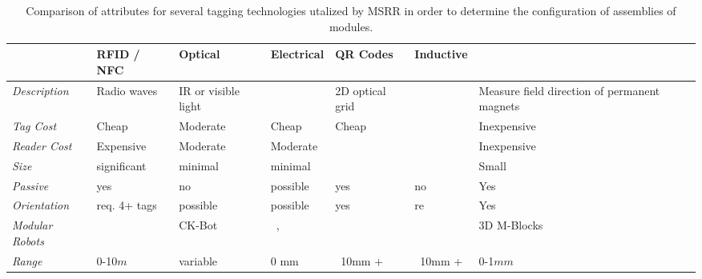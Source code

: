 \begin{table*}[t]
	\centering
	\caption{Comparison of attributes for several tagging technologies utalized by MSRR in order to determine the configuration of assemblies of modules.}
	\newcommand{\wdd}{2.05cm}
	\begin{tabular}{ p{1.7 cm} p{\wdd}  p{\wdd} p{\wdd} p{\wdd} p{\wdd} p{\wdd} p{\wdd}  }
		\hline
		\addlinespace[1ex]
											& RFID / NFC		& Optical				& Electrical 		& QR Codes 			& Inductive			& \bf{\tagNamePlural} \\ %
		\hline

		\textit{Description}				& Radio waves		& IR or visible light	& 					& 2D optical grid	&					& Measure field direction of permanent magnets \\

\addlinespace[1ex]	\textit{Tag Cost}		& Cheap				& Moderate				& Cheap				& Cheap	 			&					& Inexpensive \\

\addlinespace[1ex]	\textit{Reader Cost}	& Expensive			& Moderate				& Moderate			& 	 				&					& Inexpensive \\
		
\addlinespace[1ex] 	\textit{Size} 			& significant 		& minimal 				& minimal	  		&       			&					& Small		  \\
					
\addlinespace[1ex]	\textit{Passive} 		& yes				& no					& possible	 		& yes				& no				& Yes		  \\
		
\addlinespace[1ex] 	\textit{Orientation} 	& req. 4+ tags 		& possible 				& possible	 		& yes				& re				& Yes		\\
		
\addlinespace[1ex] 	\textit{Modular Robots}	& ~\	%
											& CK-Bot~\cite{park2008automatic}					%
											& ~\cite{Soldercubes2016}, ~\cite{ubot-Zhu-2014}	%
											& 													%
											& ~\cite{TosunDaveyLiuYim-IROS2016}					%
											& 3D M-Blocks~\cite{Romanishin20153d}	\\ 			%
		
\addlinespace[1ex] 	\textit{Range}			& 0-10$m$			& variable				& 0 mm				& ~10mm +			& ~10mm +			& 0-1$mm$	\\
	\end{tabular}
	\label{tab:tagTech}
\end{table*}

